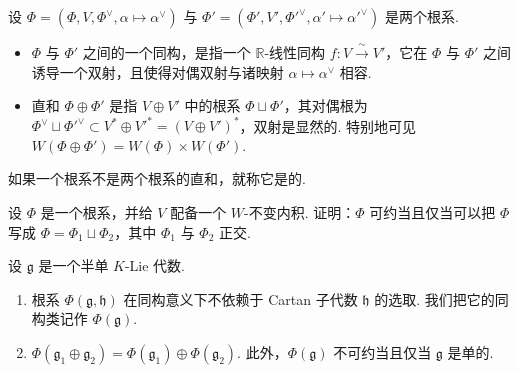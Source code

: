 \begin{numpara}\label{np:ssl-3-2-3}
设 $\Phi=(\Phi,V,\Phi^{\vee},\alpha\mapsto\alpha^{\vee})$ 与 $\Phi'=(\Phi',V',\Phi'^{\vee},\alpha'\mapsto\alpha'^{\vee})$ 是两个根系.
\begin{itemize}
\item $\Phi$ 与 $\Phi'$ 之间的一个同构，是指一个 $\mathbb{R}$-线性同构 $f\colon V\xrightarrow{\ \sim\ }V'$，它在 $\Phi$ 与 $\Phi'$ 之间诱导一个双射，且使得对偶双射与诸映射 $\alpha\mapsto\alpha^{\vee}$ 相容.
\item 直和 $\Phi\oplus\Phi'$ 是指 $V\oplus V'$ 中的根系 $\Phi\sqcup\Phi'$，其对偶根为 $\Phi^{\vee}\sqcup\Phi'^{\vee}\subset V^{*}\oplus V'^{*}=(V\oplus V')^{*}$，双射是显然的. 特别地可见 $W(\Phi\oplus\Phi')=W(\Phi)\times W(\Phi')$.
\end{itemize}
如果一个根系不是两个根系的直和，就称它是的.
\end{numpara}
\begin{exercise*}
设 $\Phi$ 是一个根系，并给 $V$ 配备一个 $W$-不变内积. 证明：$\Phi$ 可约当且仅当可以把 $\Phi$ 写成 $\Phi=\Phi_1\sqcup\Phi_2$，其中 $\Phi_1$ 与 $\Phi_2$ 正交.
\end{exercise*}
\begin{proposition*}
设 $\mathfrak g$ 是一个半单 $K$-Lie 代数.
\begin{enumerate}[label=\roman*)]
\item 根系 $\Phi(\mathfrak g,\mathfrak h)$ 在同构意义下不依赖于 Cartan 子代数 $\mathfrak h$ 的选取. 我们把它的同构类记作 $\Phi(\mathfrak g)$.
\item $\Phi(\mathfrak g_1\oplus\mathfrak g_2)=\Phi(\mathfrak g_1)\oplus\Phi(\mathfrak g_2)$. 此外，$\Phi(\mathfrak g)$ 不可约当且仅当 $\mathfrak g$ 是单的.
\end{enumerate}
\end{proposition*}

